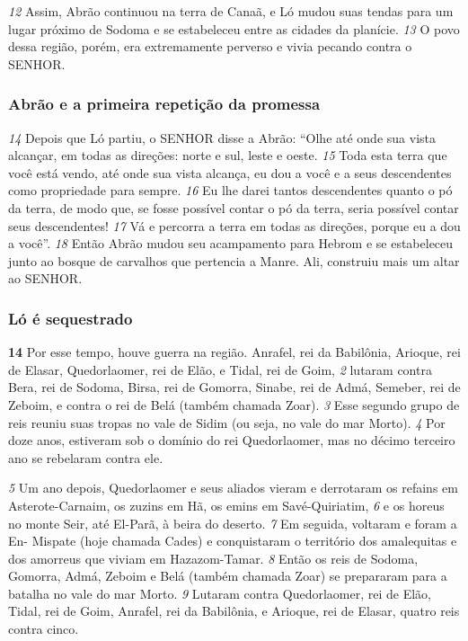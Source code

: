 \bigskip
\textit{\tiny 12}
Assim, Abrão continuou na terra de Canaã, e Ló
mudou suas tendas para um lugar próximo de Sodoma e se estabeleceu entre as
cidades da planície. 
\textit{\tiny 13}
O povo dessa região, porém, era extremamente perverso e
vivia pecando contra o SENHOR.

\bigskip
\subsubsection*{Abrão e a primeira repetição da promessa}
\textit{\tiny 14}
Depois que Ló partiu, o SENHOR disse a Abrão: “Olhe até onde sua vista
alcançar, em todas as direções: norte e sul, leste e oeste. 
\textit{\tiny 15}
Toda esta terra que
você está vendo, até onde sua vista alcança, eu dou a você e a seus descendentes
como propriedade para sempre. 
\textit{\tiny 16}
Eu lhe darei tantos descendentes quanto o pó
da terra, de modo que, se fosse possível contar o pó da terra, seria possível contar
seus descendentes! 
\textit{\tiny 17}
Vá e percorra a terra em todas as direções, porque eu a dou
a você”.
\textit{\tiny 18}
Então Abrão mudou seu acampamento para Hebrom e se estabeleceu junto
ao bosque de carvalhos que pertencia a Manre. Ali, construiu mais um altar ao
SENHOR.


\bigskip
\subsubsection*{Ló é sequestrado}
\textbf{\large 14}
 Por esse tempo, houve guerra na região. Anrafel, rei da Babilônia, Arioque, rei de Elasar, Quedorlaomer, rei de Elão, e Tidal, rei de Goim, 
\textit{\tiny 2}
lutaram contra Bera, rei de Sodoma, Birsa, rei de Gomorra, Sinabe, rei de Admá,
Semeber, rei de Zeboim, e contra o rei de Belá (também chamada Zoar).
\textit{\tiny 3}
Esse segundo grupo de reis reuniu suas tropas no vale de Sidim (ou seja, no
vale do mar Morto). 
\textit{\tiny 4}
Por doze anos, estiveram sob o domínio do rei
Quedorlaomer, mas no décimo terceiro ano se rebelaram contra ele.

\bigskip
\textit{\tiny 5}
Um   ano depois, Quedorlaomer e seus aliados vieram e derrotaram os refains
em Asterote-Carnaim, os zuzins em Hã, os emins em Savé-Quiriatim,
\textit{\tiny 6}
e os horeus
no monte Seir, até El-Parã, à beira do deserto. 
\textit{\tiny 7}
Em seguida, voltaram e foram a En-
Mispate (hoje chamada Cades) e conquistaram o território dos amalequitas e dos
amorreus que viviam em Hazazom-Tamar.
\textit{\tiny 8}
Então os reis de Sodoma, Gomorra, Admá, Zeboim e Belá (também chamada
Zoar) se prepararam para a batalha no vale do mar Morto.
\textit{\tiny 9}
Lutaram contra
Quedorlaomer, rei de Elão, Tidal, rei de Goim, Anrafel, rei da Babilônia, e Arioque,
rei de Elasar, quatro reis contra cinco. 

